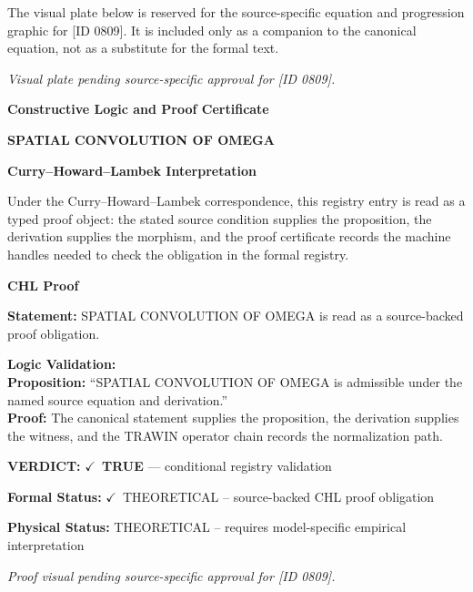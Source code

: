 \begingroup\footnotesize\sloppy
The visual plate below is reserved for the source-specific equation and progression graphic for [ID 0809]. It is included only as a companion to the canonical equation, not as a substitute for the formal text.
\par\endgroup
\begingroup\footnotesize\itshape
Visual plate pending source-specific approval for [ID 0809].
\par\endgroup

\clearpage
\begingroup\tzpsupportsetup
\noindent\textbf{\fontsize{10.8pt}{12.8pt}\selectfont [ID 0809] Constructive Logic and Proof Certificate}\par
\noindent\textbf{\fontsize{10pt}{12pt}\selectfont SPATIAL CONVOLUTION OF OMEGA}\par
\vspace{0.45em}
\begingroup
\footnotesize
\setlength{\parskip}{0.22em}
\setlength{\parindent}{0pt}
\noindent\textbf{Curry--Howard--Lambek Interpretation}\par
Under the Curry--Howard--Lambek correspondence, this registry entry is read as a typed proof
object: the stated source condition supplies the proposition, the derivation supplies the
morphism, and the proof certificate records the machine handles needed to check the obligation
in the formal registry.

\vspace{0.45em}
\noindent\textbf{CHL Proof}\par
\textbf{Statement:} SPATIAL CONVOLUTION OF OMEGA is read as a source-backed proof obligation.

\textbf{Logic Validation:}\\
\textbf{Proposition:} ``SPATIAL CONVOLUTION OF OMEGA is admissible under the named source equation and derivation.''\\
\textbf{Proof:} The canonical statement supplies the proposition, the derivation supplies the witness, and the TRAWIN operator chain records the normalization path.

\textbf{VERDICT:} \ensuremath{\checkmark}\ \textbf{TRUE} --- conditional registry validation

\textbf{Formal Status:} \ensuremath{\checkmark}\ THEORETICAL -- source-backed CHL proof obligation

\textbf{Physical Status:} THEORETICAL -- requires model-specific empirical interpretation
\par\vspace{0.45em}
\par
\vfill
\begingroup\footnotesize\itshape
Proof visual pending source-specific approval for [ID 0809].
\par\endgroup
\vfill
\endgroup
\endgroup
